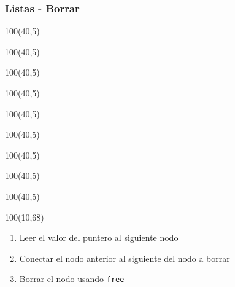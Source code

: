 \documentclass[aspectratio=169]{beamer}
\begin{document}
\begin{frame}[t]
    \frametitle{Listas - Borrar}
    \begin{textblock}{100}(40,5)  \end{textblock}  %
    
    \begin{textblock}{100}(40,5)  \end{textblock}  %
    \begin{textblock}{100}(40,5)  \end{textblock}  %
    \begin{textblock}{100}(40,5)  \end{textblock}  %
    \begin{textblock}{100}(40,5)  \end{textblock}  %
    \begin{textblock}{100}(40,5)  \end{textblock}  %
    \begin{textblock}{100}(40,5)  \end{textblock}  %
    \begin{textblock}{100}(40,5)  \end{textblock}  %
    \begin{textblock}{100}(40,5)  \end{textblock}  %
    \begin{textblock}{100}(10,68)
    \begin{enumerate}[A]
    \item Leer el valor del puntero al siguiente nodo
    \item Conectar el nodo anterior al siguiente del nodo a borrar
    \item Borrar el nodo usando \texttt{free}
    \end{enumerate}
    \end{textblock}
\end{frame}
\end{document}
